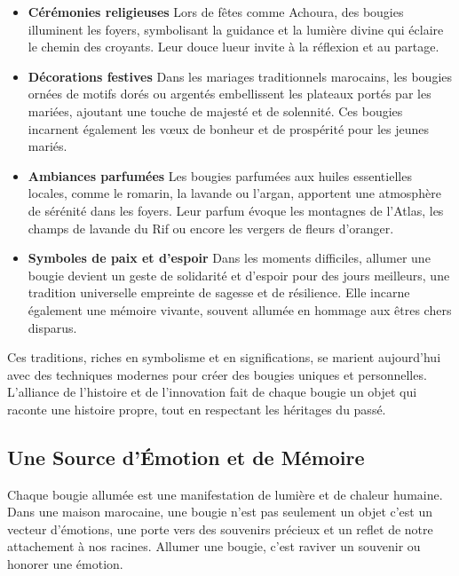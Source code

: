 \documentclass[11pt,fleqn,onecolumn,oneside]{book}
\begin{document}
\begin{itemize} \item \textbf{Cérémonies religieuses} Lors de fêtes comme Achoura, des bougies illuminent les foyers, symbolisant la guidance et la lumière divine qui éclaire le chemin des croyants. Leur douce lueur invite à la réflexion et au partage. \item \textbf{Décorations festives} Dans les mariages traditionnels marocains, les bougies ornées de motifs dorés ou argentés embellissent les plateaux portés par les mariées, ajoutant une touche de majesté et de solennité. Ces bougies incarnent également les vœux de bonheur et de prospérité pour les jeunes mariés. \item \textbf{Ambiances parfumées} Les bougies parfumées aux huiles essentielles locales, comme le romarin, la lavande ou l’argan, apportent une atmosphère de sérénité dans les foyers. Leur parfum évoque les montagnes de l’Atlas, les champs de lavande du Rif ou encore les vergers de fleurs d’oranger. \item \textbf{Symboles de paix et d’espoir} Dans les moments difficiles, allumer une bougie devient un geste de solidarité et d’espoir pour des jours meilleurs, une tradition universelle empreinte de sagesse et de résilience. Elle incarne également une mémoire vivante, souvent allumée en hommage aux êtres chers disparus. \end{itemize}

\begin{remark} Ces traditions, riches en symbolisme et en significations, se marient aujourd'hui avec des techniques modernes pour créer des bougies uniques et personnelles. L’alliance de l’histoire et de l’innovation fait de chaque bougie un objet qui raconte une histoire propre, tout en respectant les héritages du passé. \end{remark}

\subsection*{Une Source d’Émotion et de Mémoire}

\begin{corollary} Chaque bougie allumée est une manifestation de lumière et de chaleur humaine. Dans une maison marocaine, une bougie n’est pas seulement un objet c’est un vecteur d’émotions, une porte vers des souvenirs précieux et un reflet de notre attachement à nos racines. Allumer une bougie, c’est raviver un souvenir ou honorer une émotion. \end{corollary}
\end{document}
